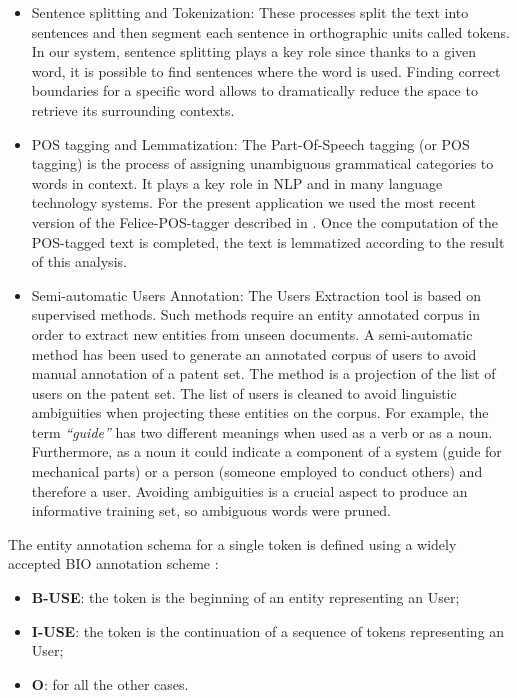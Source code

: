\documentclass[b5paper,]{book}
\providecommand{\tightlist}{%
  \setlength{\itemsep}{0pt}\setlength{\parskip}{0pt}}
\theoremstyle{definition}
\theoremstyle{definition}
\theoremstyle{definition}
\theoremstyle{remark}
\begin{document}
\begin{itemize}
\item
  Sentence splitting and Tokenization: These processes split the text
  into sentences and then segment each sentence in orthographic units
  called tokens. In our system, sentence splitting plays a key role
  since thanks to a given word, it is possible to find sentences where
  the word is used. Finding correct boundaries for a specific word
  allows to dramatically reduce the space to retrieve its surrounding
  contexts.
\item
  POS tagging and Lemmatization: The Part-Of-Speech tagging (or POS
  tagging) is the process of assigning unambiguous grammatical
  categories to words in context. It plays a key role in NLP and in many
  language technology systems. For the present application we used the
  most recent version of the Felice-POS-tagger described in
  \citep{dell2009ensemble}. Once the computation of the POS-tagged text
  is completed, the text is lemmatized according to the result of this
  analysis.
\item
  Semi-automatic Users Annotation: The Users Extraction tool is based on
  supervised methods. Such methods require an entity annotated corpus in
  order to extract new entities from unseen documents. A semi-automatic
  method has been used to generate an annotated corpus of users to avoid
  manual annotation of a patent set. The method is a projection of the
  list of users on the patent set. The list of users is cleaned to avoid
  linguistic ambiguities when projecting these entities on the corpus.
  For example, the term \emph{``guide''} has two different meanings when
  used as a verb or as a noun. Furthermore, as a noun it could indicate
  a component of a system (guide for mechanical parts) or a person
  (someone employed to conduct others) and therefore a user. Avoiding
  ambiguities is a crucial aspect to produce an informative training
  set, so ambiguous words were pruned.
\end{itemize}

The entity annotation schema for a single token is defined using a
widely accepted BIO annotation scheme \cite{ramshaw}:

\begin{itemize}
\tightlist
\item
  \textbf{B-USE}: the token is the beginning of an entity representing
  an User;
\item
  \textbf{I-USE}: the token is the continuation of a sequence of tokens
  representing an User;
\item
  \textbf{O}: for all the other cases.
\end{itemize}
\end{document}
